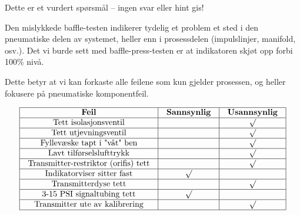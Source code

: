 Dette er et vurdert spørsmål -- ingen svar eller hint gis!







Den mislykkede baffle-testen indikerer tydelig et problem et sted i den pneumatiske delen av systemet, heller enn i prosessdelen (impulslinjer, manifold, osv.).  Det vi burde sett med baffle-press-testen er at indikatoren skjøt opp forbi 100\% nivå.

Dette betyr at vi kan forkaste alle feilene som kun gjelder prosessen, og heller fokusere på pneumatiske komponentfeil.


$$\vbox{\offinterlineskip
\halign{\strut
\vrule \quad\hfil # \ \hfil & 
\vrule \quad\hfil # \ \hfil & 
\vrule \quad\hfil # \ \hfil \vrule \cr
\noalign{\hrule}
%
{\bf Feil} & {\bf Sannsynlig} & {\bf Usannsynlig} \cr
%
\noalign{\hrule}
%
Tett isolasjonsventil & & $\surd$ \cr
%
\noalign{\hrule}
%
Tett utjevningsventil &  & $\surd$ \cr
%
\noalign{\hrule}
%
Fyllevæske tapt i "våt" ben &  & $\surd$ \cr
%
\noalign{\hrule}
%
Lavt tilførselslufttrykk &  & $\surd$ \cr
%
\noalign{\hrule}
%
Transmitter-restriktor (orifis) tett &  & $\surd$ \cr
%
\noalign{\hrule}
%
Indikatorviser sitter fast & $\surd$ & \cr
%
\noalign{\hrule}
%
Transmitterdyse tett &  & $\surd$ \cr
%
\noalign{\hrule}
%
3-15 PSI signaltubing tett & $\surd$  & \cr
%
\noalign{\hrule}
%
Transmitter ute av kalibrering &  & $\surd$ \cr
%
\noalign{\hrule}
} %
}$$ %



